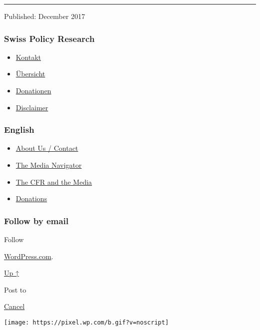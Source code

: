 \begin{center}\rule{0.5\linewidth}{\linethickness}\end{center}

Published: December 2017

\hypertarget{swiss-policy-research}{%
\subsubsection{Swiss Policy Research}\label{swiss-policy-research}}

\begin{itemize}
\tightlist
\item
  \href{https://swprs.org/kontakt/}{Kontakt}
\item
  \href{https://swprs.org/uebersicht/}{Übersicht}
\item
  \href{https://swprs.org/donationen/}{Donationen}
\item
  \href{https://swprs.org/disclaimer/}{Disclaimer}
\end{itemize}

\hypertarget{english}{%
\subsubsection{English}\label{english}}

\begin{itemize}
\tightlist
\item
  \href{https://swprs.org/contact/}{About Us / Contact}
\item
  \href{https://swprs.org/media-navigator/}{The Media Navigator}
\item
  \href{https://swprs.org/the-american-empire-and-its-media/}{The CFR
  and the Media}
\item
  \href{https://swprs.org/donations/}{Donations}
\end{itemize}

\hypertarget{follow-by-email}{%
\subsubsection{Follow by email}\label{follow-by-email}}

Follow

\href{https://wordpress.com/?ref=footer_custom_com}{WordPress.com}.

\protect\hyperlink{}{Up ↑}

Post to

\protect\hyperlink{}{Cancel}

\texttt{[image: https://pixel.wp.com/b.gif?v=noscript]}
